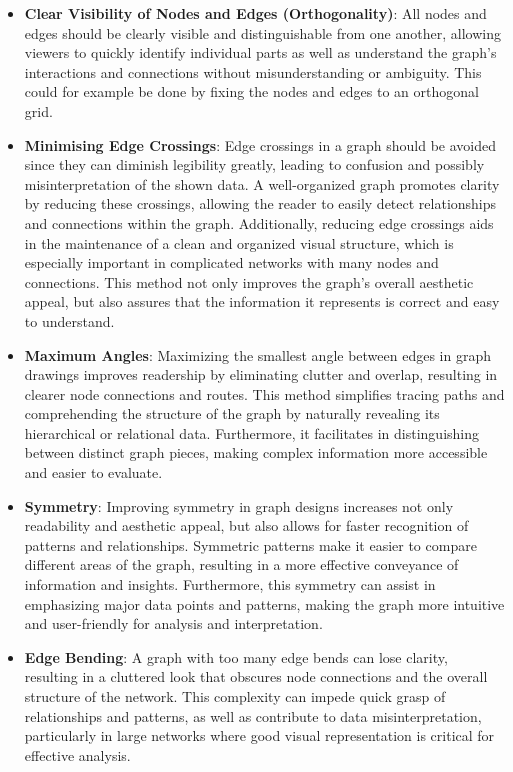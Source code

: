 \documentclass[bachelor, english]{algothesis}
\begin{document}
\begin{itemize}
    \item \textbf{Clear Visibility of Nodes and Edges (Orthogonality)}: All nodes and edges should be clearly visible and distinguishable from one another, allowing viewers to quickly identify individual parts as well as understand the graph's interactions and connections without misunderstanding or ambiguity. This could for example be done by fixing the nodes and edges to an orthogonal grid.
    \item \textbf{Minimising Edge Crossings}: Edge crossings in a graph should be avoided since they can diminish legibility greatly, leading to confusion and possibly misinterpretation of the shown data. A well-organized graph promotes clarity by reducing these crossings, allowing the reader to easily detect relationships and connections within the graph. Additionally, reducing edge crossings aids in the maintenance of a clean and organized visual structure, which is especially important in complicated networks with many nodes and connections. This method not only improves the graph's overall aesthetic appeal, but also assures that the information it represents is correct and easy to understand.
    \item \textbf{Maximum Angles}: Maximizing the smallest angle between edges in graph drawings improves readership by eliminating clutter and overlap, resulting in clearer node connections and routes. This method simplifies tracing paths and comprehending the structure of the graph by naturally revealing its hierarchical or relational data. Furthermore, it facilitates in distinguishing between distinct graph pieces, making complex information more accessible and easier to evaluate.
    \item \textbf{Symmetry}: Improving symmetry in graph designs increases not only readability and aesthetic appeal, but also allows for faster recognition of patterns and relationships. Symmetric patterns make it easier to compare different areas of the graph, resulting in a more effective conveyance of information and insights. Furthermore, this symmetry can assist in emphasizing major data points and patterns, making the graph more intuitive and user-friendly for analysis and interpretation.
    \item \textbf{Edge Bending}: A graph with too many edge bends can lose clarity, resulting in a cluttered look that obscures node connections and the overall structure of the network. This complexity can impede quick grasp of relationships and patterns, as well as contribute to data misinterpretation, particularly in large networks where good visual representation is critical for effective analysis.
\end{itemize}
\end{document}
